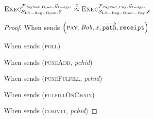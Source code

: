 \begin{lemma}
  \label{lemma:pay}
  $\textsc{Exec}^{\mathcal{F}_{\mathrm{PayNet}}{}_{\mathrm{, Open}}, \mathcal{G}_{\mathrm{Ledger}}}_{\mathcal{S}_{\mathrm{LN
  - Reg - Open}}, \mathcal{E}} \overset{c}{\approx}
  \textsc{Exec}^{\mathcal{F}_{\mathrm{PayNet}}{}_{\mathrm{, Pay}}, \mathcal{G}_{\mathrm{Ledger}}}_{\mathcal{S}_{\mathrm{LN -
  Reg - Open - Pay}}, \mathcal{E}}$
\end{lemma}

\begin{proof}
  When \environment{} sends $\left(\textsc{pay}, \mathit{Bob}, x,
  \overrightarrow{\mathtt{path}}, \mathtt{receipt}\right)$

  When \environment{} sends (\textsc{poll})

  When \environment{} sends (\textsc{pushAdd}, \textit{pchid})

  When \environment{} sends (\textsc{pushFulfill}, \textit{pchid})

  When \environment{} sends (\textsc{fulfillOnChain})

  When \environment{} sends (\textsc{commit}, \textit{pchid})
\end{proof}
